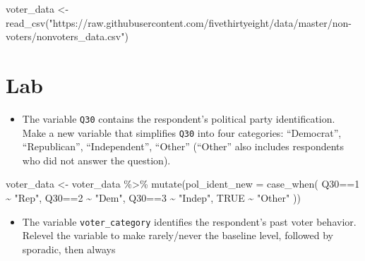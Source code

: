 \documentclass[
  letterpaper,
  DIV=11,
  numbers=noendperiod]{scrartcl}
\newenvironment{Shaded}{\begin{snugshade}}{\end{snugshade}}
\newcommand{\AttributeTok}[1]{\textcolor[rgb]{0.40,0.45,0.13}{#1}}
\newcommand{\CommentTok}[1]{\textcolor[rgb]{0.37,0.37,0.37}{#1}}
\newcommand{\ConstantTok}[1]{\textcolor[rgb]{0.56,0.35,0.01}{#1}}
\newcommand{\DecValTok}[1]{\textcolor[rgb]{0.68,0.00,0.00}{#1}}
\newcommand{\FunctionTok}[1]{\textcolor[rgb]{0.28,0.35,0.67}{#1}}
\newcommand{\NormalTok}[1]{\textcolor[rgb]{0.00,0.23,0.31}{#1}}
\newcommand{\OtherTok}[1]{\textcolor[rgb]{0.00,0.23,0.31}{#1}}
\newcommand{\SpecialCharTok}[1]{\textcolor[rgb]{0.37,0.37,0.37}{#1}}
\newcommand{\StringTok}[1]{\textcolor[rgb]{0.13,0.47,0.30}{#1}}
\providecommand{\tightlist}{%
  \setlength{\itemsep}{0pt}\setlength{\parskip}{0pt}}\usepackage{longtable,booktabs,array}
\begin{document}
\begin{Shaded}
\begin{Highlighting}[]
\NormalTok{voter\_data }\OtherTok{\textless{}{-}} \FunctionTok{read\_csv}\NormalTok{(}\StringTok{"https://raw.githubusercontent.com/fivethirtyeight/data/master/non{-}voters/nonvoters\_data.csv"}\NormalTok{)}
\end{Highlighting}
\end{Shaded}

\section{Lab}\label{lab}

\begin{itemize}
\tightlist
\item
  The variable \texttt{Q30} contains the respondent's political party
  identification. Make a new variable that simplifies \texttt{Q30} into
  four categories: ``Democrat'', ``Republican'', ``Independent'',
  ``Other'' (``Other'' also includes respondents who did not answer the
  question).
\end{itemize}

\begin{Shaded}
\begin{Highlighting}[]
\NormalTok{voter\_data }\OtherTok{\textless{}{-}}\NormalTok{ voter\_data }\SpecialCharTok{\%\textgreater{}\%}
  \FunctionTok{mutate}\NormalTok{(}\AttributeTok{pol\_ident\_new =} \FunctionTok{case\_when}\NormalTok{(}
\NormalTok{    Q30}\SpecialCharTok{==}\DecValTok{1} \SpecialCharTok{\textasciitilde{}} \StringTok{"Rep"}\NormalTok{, }
\NormalTok{    Q30}\SpecialCharTok{==}\DecValTok{2} \SpecialCharTok{\textasciitilde{}} \StringTok{"Dem"}\NormalTok{, }
\NormalTok{    Q30}\SpecialCharTok{==}\DecValTok{3} \SpecialCharTok{\textasciitilde{}} \StringTok{"Indep"}\NormalTok{, }
    \ConstantTok{TRUE} \SpecialCharTok{\textasciitilde{}} \StringTok{"Other"}
\NormalTok{  ))}
\end{Highlighting}
\end{Shaded}

\begin{itemize}
\tightlist
\item
  The variable \texttt{voter\_category} identifies the respondent's past
  voter behavior. Relevel the variable to make rarely/never the baseline
  level, followed by sporadic, then always
\end{itemize}

\begin{Shaded}
\end{Shaded}
\end{document}
